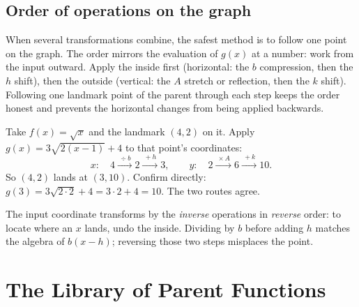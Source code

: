 \documentclass[12pt]{book}
\begin{document}
\subsection{Order of operations on the graph}

When several transformations combine, the safest method is to follow one point on
the graph. The order mirrors the evaluation of $g(x)$ at a number: work from the
input outward. Apply the inside first (horizontal: the $b$ compression, then the $h$
shift), then the outside (vertical: the $A$ stretch or reflection, then the $k$
shift). Following one landmark point of the parent through each step keeps the order
honest and prevents the horizontal changes from being applied backwards.
\begin{example}
Take $f(x)=\sqrt{x}$ and the landmark $(4,2)$ on it. Apply
$g(x)=3\sqrt{2(x-1)}+4$ to that point's coordinates:
\[
x:\quad 4 \xrightarrow{\ \div b\ } 2 \xrightarrow{\ +h\ } 3,
\qquad
y:\quad 2 \xrightarrow{\ \times A\ } 6 \xrightarrow{\ +k\ } 10.
\]
So $(4,2)$ lands at $(3,10)$. Confirm directly: $g(3)=3\sqrt{2\cdot 2}+4
=3\cdot 2+4=10$. The two routes agree.
\end{example}

\begin{pitfall}
The input coordinate transforms by the \emph{inverse} operations in \emph{reverse}
order: to locate where an $x$ lands, undo the inside. Dividing by $b$ before adding
$h$ matches the algebra of $b(x-h)$; reversing those two steps misplaces the point.
\end{pitfall}

\section{The Library of Parent Functions}
\end{document}
